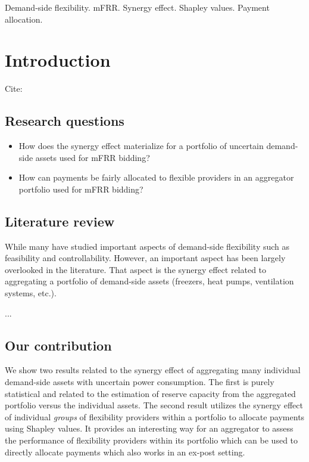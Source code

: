 \documentclass[lettersize,journal]{IEEEtran}
\begin{document}
\begin{IEEEkeywords}
    Demand-side flexibility. mFRR. Synergy effect. Shapley values. Payment allocation.
\end{IEEEkeywords}

\tableofcontents

\section{Introduction}\label{sec:Introduction}

Cite: \cite{shafiei2013modeling}

\subsection{Research questions}

\begin{itemize}
    \item How does the synergy effect materialize for a portfolio of uncertain demand-side assets used for mFRR bidding?
    \item How can payments be fairly allocated to flexible providers in an aggregator portfolio used for mFRR bidding?
\end{itemize}


\subsection{Literature review}

While many have studied important aspects of demand-side flexibility such as feasibility and controllability. However, an important aspect has been largely overlooked in the literature. That aspect is the synergy effect related to aggregating a portfolio of demand-side assets (freezers, heat pumps, ventilation systems, etc.).

...

\subsection{Our contribution}

We show two results related to the synergy effect of aggregating many individual demand-side assets with uncertain power consumption. The first is purely statistical and related to the estimation of reserve capacity from the aggregated portfolio versus the individual assets. The second result utilizes the synergy effect of individual \textit{groups} of flexibility providers within a portfolio to allocate payments using Shapley values. It provides an interesting way for an aggregator to assess the performance of flexibility providers within its portfolio which can be used to directly allocate payments which also works in an ex-post setting.
\end{document}
